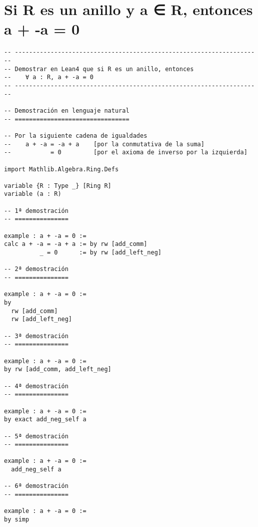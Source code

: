\section{Si R es un anillo y a ∈ R, entonces a + -a = 0}
\label{sec:orgd7a43af}
\begin{verbatim}
-- ---------------------------------------------------------------------
-- Demostrar en Lean4 que si R es un anillo, entonces
--    ∀ a : R, a + -a = 0
-- ---------------------------------------------------------------------

-- Demostración en lenguaje natural
-- ================================

-- Por la siguiente cadena de igualdades
--    a + -a = -a + a    [por la conmutativa de la suma]
--           = 0         [por el axioma de inverso por la izquierda]

import Mathlib.Algebra.Ring.Defs

variable {R : Type _} [Ring R]
variable (a : R)

-- 1ª demostración
-- ===============

example : a + -a = 0 :=
calc a + -a = -a + a := by rw [add_comm]
          _ = 0      := by rw [add_left_neg]

-- 2ª demostración
-- ===============

example : a + -a = 0 :=
by
  rw [add_comm]
  rw [add_left_neg]

-- 3ª demostración
-- ===============

example : a + -a = 0 :=
by rw [add_comm, add_left_neg]

-- 4ª demostración
-- ===============

example : a + -a = 0 :=
by exact add_neg_self a

-- 5ª demostración
-- ===============

example : a + -a = 0 :=
  add_neg_self a

-- 6ª demostración
-- ===============

example : a + -a = 0 :=
by simp
\end{verbatim}

